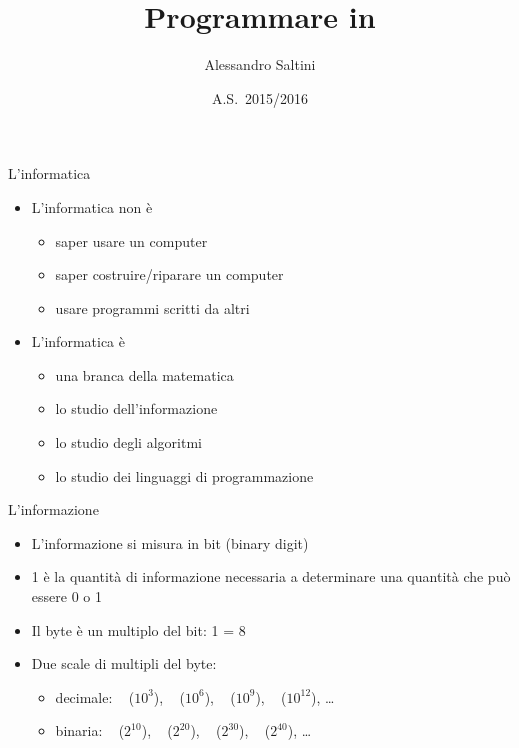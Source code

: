 \documentclass[xcolor=dvipsnames,handout]{beamer}
\title[\CC]{Programmare in \CC}
\author[A.~Saltini]{Alessandro Saltini}
\institute[LS Tassoni]{Liceo Scientifico Statale ``A.~Tassoni''}
\date{A.S.~2015/2016}
\begin{document}
\begin{frame}[noframenumbering]
  \titlepage
\end{frame}

\begin{frame}{L'informatica}
  \vfill
  \begin{itemize}
    \item L'informatica \alert{non} è
    \begin{itemize}
      \item saper usare un computer
      \item saper costruire/riparare un computer
      \item usare programmi scritti da altri
    \end{itemize}
    \vfill
    \item L'informatica è
    \begin{itemize}
      \item una branca della matematica
      \item lo studio dell'\alert{informazione}
      \item lo studio degli \alert{algoritmi}
      \item lo studio dei \alert{linguaggi di programmazione}
    \end{itemize}
  \end{itemize}
  \vfill
\end{frame}

\begin{frame}{L'informazione}
  \vfill
  \begin{itemize}
    \item L'informazione si misura in \alert{bit} (\alert{bi}nary digi\alert{t})
    \vfill
    \item \SI{1}{\bit} è la quantità di informazione necessaria a determinare una
    quantità che può essere \alert{0} o \alert{1}
    \vfill
    \item Il \alert{byte} è un multiplo del bit: \SI{1}{\byte} = \SI{8}{\bit}
    \vfill
    \item Due scale di multipli del byte:
    \begin{itemize}
      \item decimale: \si{\kilo\byte} (\(10^3\)), \si{\mega\byte} (\(10^6\)), \si{\giga\byte} (\(10^9\)), \si{\tera\byte} (\(10^{12}\)), \dots
      \item \alert{binaria}: \si{\kibi\byte} (\(2^{10}\)), \si{\mebi\byte} (\(2^{20}\)), \si{\gibi\byte} (\(2^{30}\)), \si{\tebi\byte} (\(2^{40}\)), \dots
    \end{itemize}
  \end{itemize}
  \vfill
\end{frame}
\end{document}
